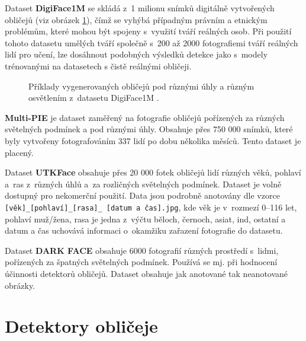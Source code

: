 Dataset \textbf{DigiFace1M} \cite{digiface1m} se skládá z~1 milionu snímků digitálně vytvořených obličejů (viz obrázek \ref{obrazek:digiface}), čímž se vyhýbá případným právním a etnickým problémům, které mohou být spojeny s~využití tváří reálných osob. Při použití tohoto datasetu umělých tváří společně s~200 až 2000 fotografiemi tváří reálných lidí pro učení, lze dosáhnout podobných výsledků detekce jako s~modely trénovanými na datasetech s čistě reálnými obličeji.

\begin{figure}[H]
  \begin{center}
  \label{obrazek:digiface}
  \caption{Příklady vygenerovaných obličejů pod různými úhly a různým osvětlením z~datasetu DigiFace1M \cite{digiface1m}.}
  \end{center}
\end{figure}

\textbf{Multi-PIE} \cite{multipie} je dataset zaměřený na fotografie obličejů pořízených za různých světelných podmínek a pod různými úhly. Obsahuje přes 750 000 snímků, které byly vytvořeny fotografováním 337 lidí po dobu několika měsíců. Tento dataset je placený.

Dataset \textbf{UTKFace} \cite{utkface} obsahuje přes 20 000 fotek obličejů lidí různých věků, pohlaví a~ras z~různých úhlů a~za rozličných světelných podmínek. Dataset je volně dostupný pro nekomerční použití. Data jsou podrobně anotovány dle vzorce \texttt{[věk]\_[pohlaví]\_[rasa]\_
[datum a čas].jpg}, kde věk je v~rozmezí 0--116 let, pohlaví muž/žena, rasa je jedna z~výčtu běloch, černoch, asiat, ind, ostatní a datum a čas uchovává informaci o~okamžiku zařazení fotografie do datasetu.

Dataset \textbf{DARK FACE} \cite{darkFace} obsahuje 6000 fotografií různých prostředí s~lidmi, pořízených za špatných světelných podmínek. Používá se mj. při hodnocení účinnosti detektorů obličejů. Dataset obsahuje jak anotované tak neanotované obrázky.

\section{Detektory obličeje}
\label{sekce:NSdetektory}


